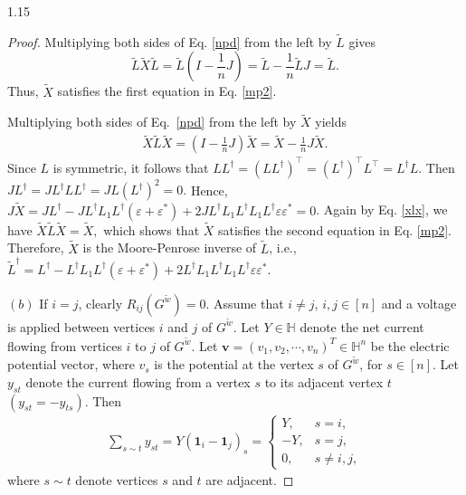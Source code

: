 \documentclass[preprint,12pt]{elsarticle1}
\numberwithin{equation}{section}
\begin{document}
\begin{spacing}{1.15}
\begin{proof}
  Multiplying both sides of Eq. \eqref{npd} from the left by $\widetilde{L}$  gives $$\widetilde{L}\widetilde{X}\widetilde{L}=\widetilde{L}(I-\frac{1}{n}J)=\widetilde{L}-
\frac{1}{n}\widetilde{L}J=\widetilde{L}.$$
Thus, $\widetilde{X}$  satisfies the first equation in Eq. \eqref{mp2}.

Multiplying both sides of Eq.~\eqref{npd} from the left by $\widetilde{X}$ yields
\begin{align}\label{xlx}\widetilde{X}\widetilde{L}\widetilde{X}=(I-\frac{1}{n}J)\widetilde{X}=\widetilde{X}-
\frac{1}{n}J\widetilde{X}.\end{align}
Since $L$ is symmetric, it follows that $LL^{\dag}
=(LL^{\dag})^{\top}
=(L^{\dag})^{\top}L^{\top}
=L^{\dag}L.$
Then $JL^{\dag}=
JL^{\dag}LL^{\dag}
=JL(L^{\dag})^{2}=0.$ Hence, $J
\widetilde{X}=JL^{\dag}-
JL^{\dag}L_{1}L^{\dag}(\varepsilon+\varepsilon^{*})
+2JL^{\dag}L_{1}L^{\dag}L_{1}L^{\dag}
\varepsilon\varepsilon^{*}=0$.
Again by Eq. \eqref{xlx}, we have
$\widetilde{X}\widetilde{L}\widetilde{X}=
\widetilde{X},$
which  shows that $\widetilde{X}$ satisfies the second equation in Eq. \eqref{mp2}.
Therefore,
$\widetilde{X}$  is the Moore-Penrose inverse of $\widetilde{L}$, i.e.,
$\widetilde{L}^{\dag}=L^{\dag}-
L^{\dag}L_{1}L^{\dag}(\varepsilon+\varepsilon^{*})
+2L^{\dag}L_{1}L^{\dag}L_{1}L^{\dag}
\varepsilon\varepsilon^{*}.$

$(b)$
If $i=j$, clearly $R_{ij}(G^{\widetilde{w}})=0$. Assume  that
 $i\neq j$, $i,j\in[n]$ and  a voltage is applied  between vertices $i$ and $j$ of $G^{\widetilde{w}}$. Let  $Y\in \mathbb{H}$ denote the net current flowing from vertices $i$ to $j$ of $G^{\widetilde{w}}$. Let $\textbf{v}=(v_{1},v_{2},\cdots,v_{n})^{T}\in \mathbb{H}^{n}$ be the electric potential vector, where $v_{s}$ is the potential at the vertex $s$ of $G^{\widetilde{w}}$, for $s\in[n]$. Let $y_{st}$ denote the current flowing from a vertex $s$ to its adjacent vertex $t$ $(y_{st}=-y_{ts})$. Then
\begin{align}\label{lmt}
\sum_{s\sim t}y_{st}=Y(\textbf{1}_{i}-\textbf{1}_{j})_{s}=\begin{cases}
Y, & s=i,\\
-Y, & s=j,\\
0,  & s\neq i,j,
\end{cases}
\end{align}
where $s\sim t$ denote vertices $s$ and $t$ are adjacent.


\end{proof}
\end{spacing}
\end{document}
